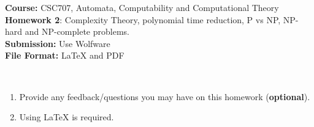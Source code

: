 \documentclass{article}%
\begin{document}
\begin{flushleft}
\textbf{Course:} CSC707, Automata, Computability and Computational Theory\\
\textbf{Homework 2}: Complexity Theory, polynomial time reduction, P vs NP, NP-hard and NP-complete problems. \\
\textbf{Submission:} Use Wolfware\\
\textbf{File Format:} LaTeX and PDF\\
\end{flushleft}

\begin{center}
\\
\begin{enumerate}
	\item Provide any feedback/questions you may have on this homework (\textbf{optional}).
	\item Using LaTeX is required.
\end{enumerate}\end{center}

\noindent{\hrulefill}

\bigskip
\end{document}
